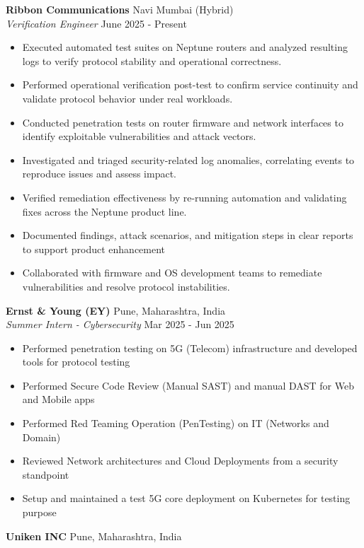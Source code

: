 \documentclass[a4paper]{article}
\begin{document}
\textbf{Ribbon Communications} \hfill Navi Mumbai (Hybrid)\\
\textit{Verification Engineer} \hfill June 2025 - Present\\
\vspace{-1mm}
\begin{itemize} \itemsep 1pt
	\item Executed automated test suites on Neptune routers and analyzed resulting logs to verify protocol stability and operational correctness.
	\item Performed operational verification post-test to confirm service continuity and validate protocol behavior under real workloads.
	\item Conducted penetration tests on router firmware and network interfaces to identify exploitable vulnerabilities and attack vectors.
	\item Investigated and triaged security-related log anomalies, correlating events to reproduce issues and assess impact.
	\item Verified remediation effectiveness by re-running automation and validating fixes across the Neptune product line.
	\item Documented findings, attack scenarios, and mitigation steps in clear reports to support product enhancement
	\item Collaborated with firmware and OS development teams to remediate vulnerabilities and resolve protocol instabilities.
\end{itemize}
\textbf{Ernst \& Young (EY)} \hfill Pune, Maharashtra, India\\
\textit{Summer Intern - Cybersecurity} \hfill Mar 2025 - Jun 2025\\
\vspace{-1mm}
\begin{itemize} \itemsep 1pt
	\item Performed penetration testing on 5G (Telecom) infrastructure and developed tools for protocol testing
	\item Performed Secure Code Review (Manual SAST) and manual DAST for Web and Mobile apps
	\item Performed Red Teaming Operation (PenTesting) on IT (Networks and Domain)
	\item Reviewed Network architectures and Cloud Deployments from a security standpoint
	\item Setup and maintained a test 5G core deployment on Kubernetes for testing purpose
\end{itemize}
\textbf{Uniken INC} \hfill Pune, Maharashtra, India\\
\end{document}
